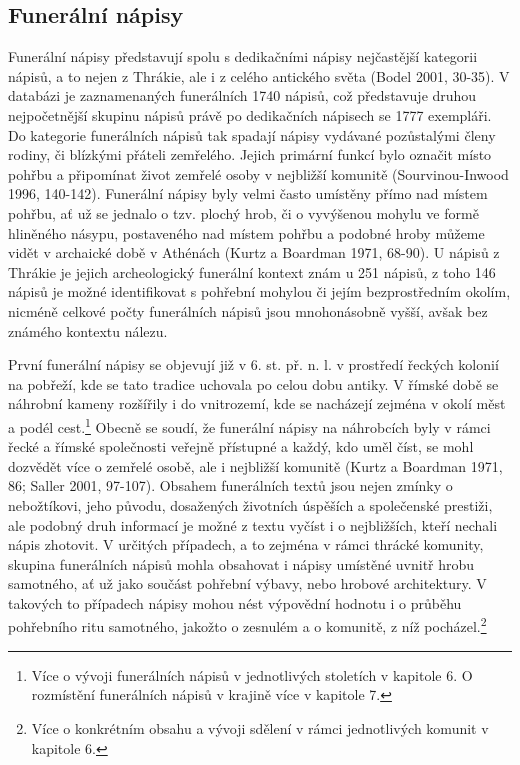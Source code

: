 
\subsection[funerální-nápisy]{Funerální nápisy}

Funerální nápisy představují spolu s dedikačními nápisy nejčastější kategorii nápisů, a to nejen z Thrákie, ale i z celého antického světa (Bodel 2001, 30-35). V databázi je zaznamenaných funerálních 1740 nápisů, což představuje druhou nejpočetnější skupinu nápisů právě po dedikačních nápisech se 1777 exempláři. Do kategorie funerálních nápisů tak spadají nápisy vydávané pozůstalými členy rodiny, či blízkými přáteli zemřelého. Jejich primární funkcí bylo označit místo pohřbu a připomínat život zemřelé osoby v nejbližší komunitě (Sourvinou-Inwood 1996, 140-142). Funerální nápisy byly velmi často umístěny přímo nad místem pohřbu, ať už se jednalo o tzv. plochý hrob, či o vyvýšenou mohylu ve formě hliněného násypu, postaveného nad místem pohřbu a podobné hroby můžeme vidět v archaické době v Athénách (Kurtz a Boardman 1971, 68-90). U nápisů z Thrákie je jejich archeologický funerální kontext znám u 251 nápisů, z toho 146 nápisů je možné identifikovat s pohřební mohylou či jejím bezprostředním okolím, nicméně celkové počty funerálních nápisů jsou mnohonásobně vyšší, avšak bez známého kontextu nálezu.

První funerální nápisy se objevují již v 6. st. př. n. l. v prostředí řeckých kolonií na pobřeží, kde se tato tradice uchovala po celou dobu antiky. V římské době se náhrobní kameny rozšířily i do vnitrozemí, kde se nacházejí zejména v okolí měst a podél cest.\footnote{Více o vývoji funerálních nápisů v jednotlivých stoletích v kapitole 6. O rozmístění funerálních nápisů v krajině více v kapitole 7.} Obecně se soudí, že funerální nápisy na náhrobcích byly v rámci řecké a římské společnosti veřejně přístupné a každý, kdo uměl číst, se mohl dozvědět více o zemřelé osobě, ale i nejbližší komunitě (Kurtz a Boardman 1971, 86; Saller 2001, 97-107). Obsahem funerálních textů jsou nejen zmínky o nebožtíkovi, jeho původu, dosažených životních úspěších a společenské prestiži, ale podobný druh informací je možné z textu vyčíst i o nejbližších, kteří nechali nápis zhotovit. V určitých případech, a to zejména v rámci thrácké komunity, skupina funerálních nápisů mohla obsahovat i nápisy umístěné uvnitř hrobu samotného, ať už jako součást pohřební výbavy, nebo hrobové architektury. V takových to případech nápisy mohou nést výpovědní hodnotu i o průběhu pohřebního ritu samotného, jakožto o zesnulém a o komunitě, z níž pocházel.\footnote{Více o konkrétním obsahu a vývoji sdělení v rámci jednotlivých komunit v kapitole 6.}

